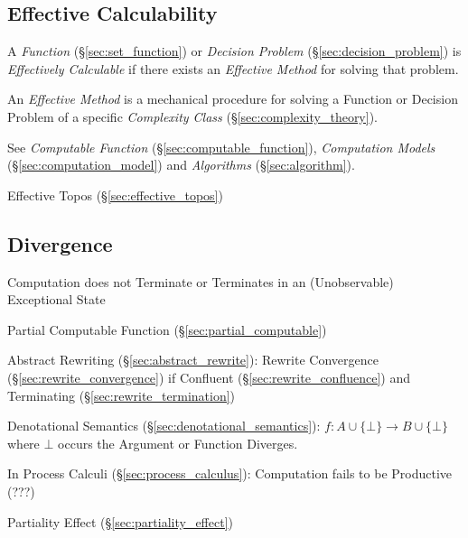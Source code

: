 \subsection{Effective Calculability}\label{sec:effective_method}

A \emph{Function} (\S\ref{sec:set_function}) or \emph{Decision
  Problem} (\S\ref{sec:decision_problem}) is \emph{Effectively
  Calculable} if there exists an \emph{Effective Method} for solving
that problem.

An \emph{Effective Method} is a mechanical procedure for solving a
Function or Decision Problem of a specific \emph{Complexity Class}
(\S\ref{sec:complexity_theory}).

See \emph{Computable Function} (\S\ref{sec:computable_function}),
\emph{Computation Models} (\S\ref{sec:computation_model}) and
\emph{Algorithms} (\S\ref{sec:algorithm}).

Effective Topos (\S\ref{sec:effective_topos})



\subsection{Divergence}\label{sec:divergence}

Computation does not Terminate or Terminates in an (Unobservable)
Exceptional State

Partial Computable Function (\S\ref{sec:partial_computable})

Abstract Rewriting (\S\ref{sec:abstract_rewrite}): Rewrite Convergence
(\S\ref{sec:rewrite_convergence}) if Confluent
(\S\ref{sec:rewrite_confluence}) and Terminating
(\S\ref{sec:rewrite_termination})

Denotational Semantics (\S\ref{sec:denotational_semantics}): $f : A
\cup \{\bot\} \rightarrow B \cup \{\bot\}$ where $\bot$ occurs the
Argument or Function Diverges.

In Process Calculi (\S\ref{sec:process_calculus}): Computation fails
to be Productive (???) %

Partiality Effect (\S\ref{sec:partiality_effect})



